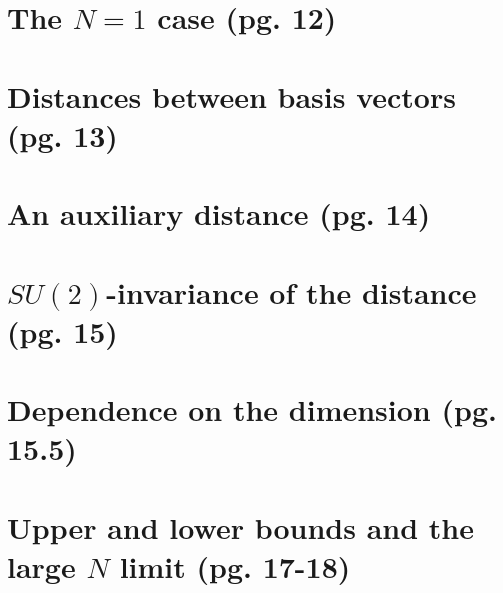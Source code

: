 \documentclass{article}
\begin{document}
\section{The $N = 1$ case (pg. 12)}

\section{Distances between basis vectors (pg. 13)}

\section{An auxiliary distance (pg. 14)}

\section{$SU(2)$-invariance of the distance (pg. 15)}

\section{Dependence on the dimension (pg. 15.5)}

\section{Upper and lower bounds and the large $N$ limit (pg. 17-18)}
\end{document}
